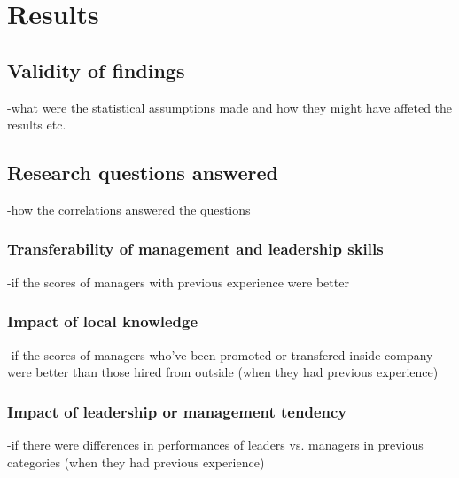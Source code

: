 \section{Results}
\label{Results}

\subsection{Validity of findings}
\label{Validity of findings}
-what were the statistical assumptions made and how they might have affeted the
results etc.

\subsection{Research questions answered}
\label{Research questions answered}
-how the correlations answered the questions

\subsubsection{Transferability of management and leadership skills}
\label{Transferability of management and leadership skills}
-if the scores of managers with previous experience were better

\subsubsection{Impact of local knowledge}
\label{Impact of local knowledge}
-if the scores of managers who've been promoted or transfered inside company
were better than those hired from outside (when they had previous experience)

\subsubsection{Impact of leadership or management tendency}
\label{Impact of leadership or management tendency}
-if there were differences in performances of leaders vs. managers in previous
categories (when they had previous experience)
